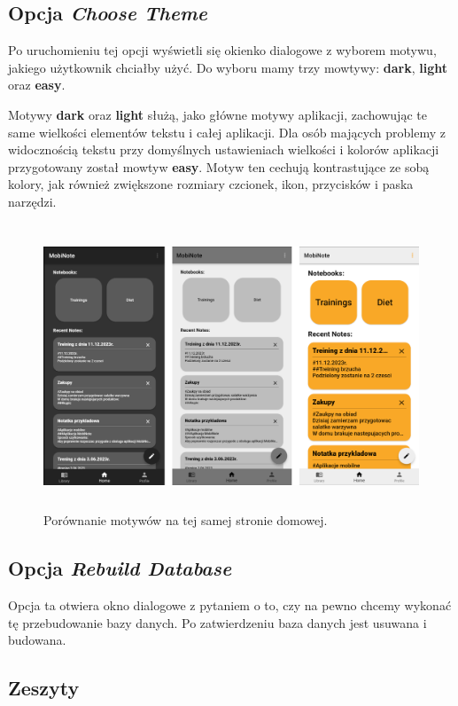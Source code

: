 \subsection{Opcja \textit{Choose Theme}}

Po uruchomieniu tej opcji wyświetli się okienko dialogowe z wyborem motywu, jakiego użytkownik chciałby użyć. Do wyboru mamy trzy mowtywy: \textbf{dark}, \textbf{light} oraz \textbf{easy}.

Motywy \textbf{dark} oraz \textbf{light} służą, jako główne motywy aplikacji, zachowując te same wielkości elementów tekstu i całej aplikacji.
Dla osób mających problemy z widocznością tekstu przy domyślnych ustawieniach wielkości i kolorów aplikacji przygotowany został mowtyw \textbf{easy}.
Motyw ten cechują kontrastujące ze sobą kolory, jak również zwiększone rozmiary czcionek, ikon, przycisków i paska narzędzi.

\begin{figure}[ht]
    \centering
    \includegraphics[height=8.5cm]{images/strona_domowa_motywy.png}
    \caption{Porównanie motywów na tej samej stronie domowej.}
\end{figure}

\subsection{Opcja \textit{Rebuild Database}}

Opcja ta otwiera okno dialogowe z pytaniem o to, czy na pewno chcemy wykonać tę przebudowanie bazy danych. Po zatwierdzeniu baza danych jest usuwana i budowana.

\subsection{Zeszyty}

